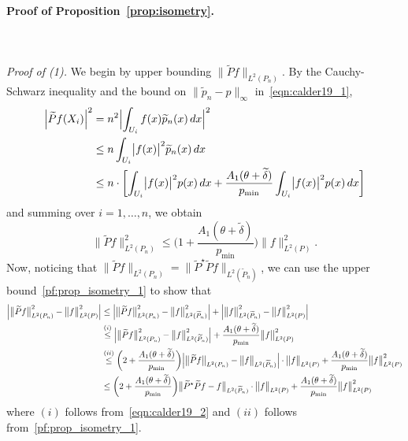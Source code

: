 \documentclass[twoside]{article}
\newcommand{\1}{\mathbf{1}}
\newcommand{\Leb}{L}
\newcommand{\wt}[1]{\widetilde{#1}}
\theoremstyle{definition}
\theoremstyle{remark}
\begin{document}
\paragraph{Proof of Proposition~\ref{prop:isometry}.}
\mbox{}\\
\mbox{}\\
\textit{Proof of (1).}
We begin by upper bounding $\bigl\|\wt{P}f\bigr\|_{\Leb^2(P_n)}$. By the Cauchy-Schwarz inequality and the bound on $\|\wt{p}_n - p\|_{\infty}$ in~\eqref{eqn:calder19_1},
\begin{align*}
\Bigl|\wt{P}f(X_i)\Bigr|^2 & = n^2 \Bigl|\int_{U_i} f(x) \wt{p}_n(x) \,dx\Bigr|^2 \\
& \leq n \int_{U_i} \bigl|f(x)\bigr|^2 \wt{p}_n(x) \,dx \\
& \leq n \cdot \biggl[\int_{U_i} \bigl|f(x)\bigr|^2 p(x) \,dx + \frac{A_1(\theta + \wt{\delta})}{p_{\min}} \int_{U_i} \bigl|f(x)\bigr|^2 p(x) \,dx\biggr]
\end{align*}
and summing over $i = 1,\ldots,n$, we obtain
\begin{equation}
\label{pf:prop_isometry_1}
\bigl\|\wt{P}f\bigr\|_{\Leb^2(P_n)}^2 \leq \biggl(1 + \frac{A_1(\theta + \wt{\delta})}{p_{\min}}\biggr) \bigl\|f\bigr\|_{\Leb^2(P)}^2.
\end{equation}
Now, noticing that $\bigl\|\wt{P}f\bigr\|_{\Leb^2(P_n)} = \bigl\|\wt{P}^{\star}\wt{P}f\bigr\|_{\Leb^2(\wt{P}_n)}$, we can use the upper bound~\eqref{pf:prop_isometry_1} to show that
\begin{align}
\Bigl|\bigl\|\wt{P}f\bigr\|_{\Leb^2(P_n)}^2 - \bigl\|f\bigr\|_{\Leb^2(P)}^2\Bigr| & \leq \Bigl|\bigl\|\wt{P}f\bigr\|_{\Leb^2(P_n)}^2 - \bigl\|f\bigr\|_{\Leb^2(\wt{P}_n)}^2\Bigr| + \Bigl|\bigl\|f\bigr\|_{\Leb^2(\wt{P}_n)}^2 - \bigl\|f\bigr\|_{\Leb^2(P)}^2\Bigr| \nonumber \\
& \overset{(i)}{\leq} \Bigl|\bigl\|\wt{P}f\bigr\|_{\Leb^2(P_n)}^2 - \bigl\|f\bigr\|_{\Leb^2(\wt{P}_n)}^2\Bigr|  + \frac{A_1(\theta + \wt{\delta})}{p_{\min}} \bigl\|f\bigr\|_{\Leb^2(P)}^2 \\
& \overset{(ii)}{\leq} \biggl(2 + \frac{A_1(\theta + \wt{\delta})}{p_{\min}}\biggr) \Bigl|\bigl\|\wt{P}f\bigr\|_{\Leb^2(P_n)} - \bigl\|f\bigr\|_{\Leb^2(\wt{P}_n)}\Bigr| \cdot \bigl\|f\bigr\|_{\Leb^2(P)} + \frac{A_1(\theta + \wt{\delta})}{p_{\min}} \bigl\|f\bigr\|_{\Leb^2(P)}^2 \nonumber \\
& \leq \biggl(2 + \frac{A_1(\theta + \wt{\delta})}{p_{\min}}\biggr) \bigl\|\wt{P}^{\star}\wt{P}f - f\bigr\|_{\Leb^2(\wt{P}_n)} \cdot \bigl\|f\bigr\|_{\Leb^2(P)} + \frac{A_1(\theta + \wt{\delta})}{p_{\min}} \bigl\|f\bigr\|_{\Leb^2(P)}^2 \label{pf:prop_isometry_2}
\end{align}
where $(i)$ follows from~\eqref{eqn:calder19_2} and $(ii)$ follows from~\eqref{pf:prop_isometry_1}. 
\end{document}
